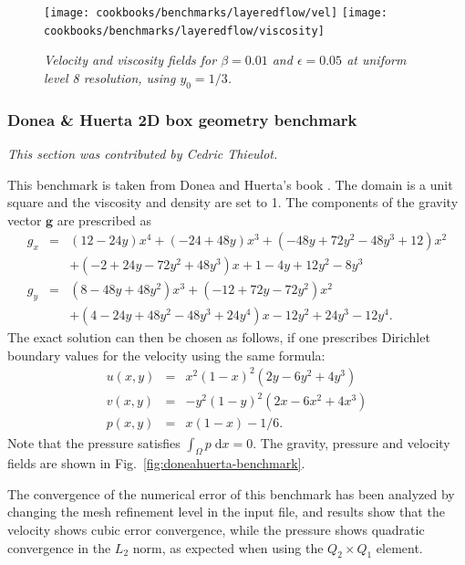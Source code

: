 \documentclass{article}
\begin{document}
\begin{figure}
\begin{center}
  \centering
  \texttt{[image: cookbooks/benchmarks/layeredflow/vel]}
  \texttt{[image: cookbooks/benchmarks/layeredflow/viscosity]}
  \caption{\it Velocity and viscosity fields for $\beta=0.01$ and
    $\epsilon=0.05$ at uniform level 8 resolution, using $y_0=1/3$.}  
  \label{fig:layeredflow2}
\end{center}
\end{figure}









\subsubsection{Donea \& Huerta 2D box geometry benchmark}
\label{sec:benchmark-donea-huerta}

\textit{This section was contributed by Cedric Thieulot.}

This benchmark is taken from Donea and Huerta's book \cite{DH03book}.
The domain is a unit square and the viscosity and density are set to 1. 
The components of the gravity vector $\mathbf g$ are prescribed as 
\begin{eqnarray}
g_x &=& (12 - 24y) x^4 + (-24 + 48y) x^3 + (-48y + 72y^2 - 48 y^3 + 12) x^2 \nonumber\\
    && + (-2 + 24y -72y^2+48y^3)x + 1-4y + 12y^2-8y^3 \nonumber\\ 
g_y &=& (8 - 48y + 48 y^2) x^3 + (-12 + 72y - 72y^2) x^2  \nonumber\\
    && + (4 - 24y + 48y^2 - 48y^3 + 24y^4) x - 12y^2 + 24y^3 - 12y^4. 
\end{eqnarray}
The exact solution can then be chosen as follows, if one prescribes Dirichlet boundary 
values for the velocity using the same formula:
\begin{eqnarray}
u(x,y) &=& x^2(1- x)^2 (2y - 6y^2 + 4y^3)  \nonumber\\
v(x,y) &=& -y^2 (1 - y)^2 (2x - 6x^2 + 4x^3) \nonumber\\
p(x,y) &=& x(1 -x) -1/6. 
\end{eqnarray}
Note that the pressure satisfies $\int_{\Omega} p \; \text{d}x = 0$.
The gravity, pressure and velocity fields are shown in Fig.~\ref{fig:doneahuerta-benchmark}.

The convergence of the numerical error of this benchmark has been analyzed by
changing the mesh refinement level in the input file, and
results show that the velocity shows cubic error
convergence, while the pressure shows quadratic convergence in the 
$L_2$ norm, as expected when using the $Q_2\times Q_1$ element.
\end{document}
